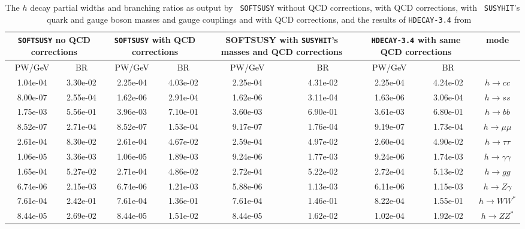 \documentclass[final,3p,times]{elsarticle}
\begin{document}
\begin{center}
\begin{table} %
\centering
\begin{tabular}{|c|c|c|c|c|c|c|c|c|} \hline
\multicolumn{2}{|C{3.0cm}|}{{\tt SOFTSUSY} no QCD corrections} & \multicolumn{2}{C{3.0cm}|}{{\tt SOFTSUSY} with QCD corrections} & \multicolumn{2}{C{3.0cm}|}{SOFTSUSY with {\tt SUSYHIT}'s masses and QCD corrections} & \multicolumn{2}{C{3.0cm}|}{{\tt HDECAY-3.4} with same QCD corrections} & mode \\ \hline
PW/GeV & BR & PW/GeV & BR & PW/GeV & BR & PW/GeV & BR & \\ \hline
1.04e-04 & 3.30e-02 & 2.25e-04 & 4.03e-02 & 2.25e-04 & 4.31e-02 & 2.25e-04 & 4.24e-02 & $h \rightarrow c c$ \\ \hline
8.00e-07 & 2.55e-04 & 1.62e-06 & 2.91e-04 & 1.62e-06 & 3.11e-04 & 1.63e-06 & 3.06e-04 & $h \rightarrow s s$ \\ \hline
1.75e-03 & 5.56e-01 & 3.96e-03 & 7.10e-01 & 3.60e-03 & 6.90e-01 & 3.61e-03 & 6.80e-01 & $h \rightarrow b b$ \\ \hline
8.52e-07 & 2.71e-04 & 8.52e-07 & 1.53e-04 & 9.17e-07 & 1.76e-04 & 9.19e-07 & 1.73e-04 & $h \rightarrow \mu \mu$ \\ \hline
2.61e-04 & 8.30e-02 & 2.61e-04 & 4.67e-02 & 2.59e-04 & 4.97e-02 & 2.60e-04 & 4.90e-02 & $h \rightarrow \tau \tau$ \\ \hline
1.06e-05 & 3.36e-03 & 1.06e-05 & 1.89e-03 & 9.24e-06 & 1.77e-03 & 9.24e-06 & 1.74e-03 & $h \rightarrow \gamma \gamma$ \\ \hline
1.65e-04 & 5.27e-02 & 2.71e-04 & 4.86e-02 & 2.72e-04 & 5.22e-02 & 2.72e-04 & 5.13e-02 & $h \rightarrow g g$ \\ \hline
6.74e-06 & 2.15e-03 & 6.74e-06 & 1.21e-03 & 5.88e-06 & 1.13e-03 & 6.11e-06 & 1.15e-03 & $h \rightarrow Z \gamma$ \\ \hline
7.61e-04 & 2.42e-01 & 7.61e-04 & 1.36e-01 & 7.61e-04 & 1.46e-01 & 8.22e-04 & 1.55e-01 & $h \rightarrow W W^*$ \\ \hline
8.44e-05 & 2.69e-02 & 8.44e-05 & 1.51e-02 & 8.44e-05 & 1.62e-02 & 1.02e-04 & 1.92e-02 & $h \rightarrow Z Z^*$ \\ \hline
\end{tabular}
\caption{The $h$ decay partial widths and branching ratios as output by {\tt
    SOFTSUSY} without QCD corrections, with QCD corrections, with {\tt
    SUSYHIT}'s quark and gauge boson masses and gauge couplings and with QCD
  corrections, and the results of {\tt HDECAY-3.4} from {\tt
}}
\end{table}
\end{center}
\end{document}

